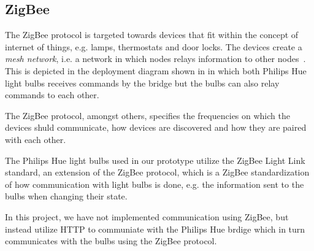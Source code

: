 \subsection{ZigBee}

The ZigBee protocol is targeted towards devices that fit within the concept of internet of things, e.g. lamps, thermostats and door locks. The devices create a \emph{mesh network}, i.e. a network in which nodes relays information to other nodes~\cite{zigbee:zigbee-pro}. This is depicted in the deployment diagram shown in  in which both Philips Hue light bulbs receives commands by the bridge but the bulbs can also relay commands to each other.

The ZigBee protocol, amongst others, specifies the frequencies on which the devices shuld communicate, how devices are discovered and how they are paired with each other.

The Philips Hue light bulbs used in our prototype utilize the ZigBee Light Link standard, an extension of the ZigBee protocol, which is a ZigBee standardization of how communication with light bulbs is done, e.g. the information sent to the bulbs when changing their state.

In this project, we have not implemented communication using ZigBee, but instead utilize HTTP to communiate with the Philips Hue brdige which in turn communicates with the bulbs using the ZigBee protocol.


